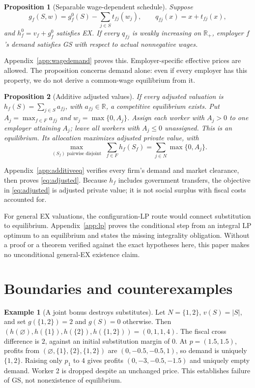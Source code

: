 \documentclass[11pt]{article}
\newtheorem{proposition}{Proposition}
\theoremstyle{definition}
\newtheorem{example}{Example}
\theoremstyle{remark}
\numberwithin{equation}{section}
\begin{document}
\begin{proposition}[Separable wage-dependent schedule]\label{prop:wagedemand}
Suppose
\begin{equation}
g_f(S,w)=g_f^0(S)-\sum_{j\in S}t_{fj}(w_j),\qquad
q_{fj}(x)=x+t_{fj}(x),                          \label{eq:effective}
\end{equation}
and $h_f^0=v_f+g_f^0$ satisfies EX. If every $q_{fj}$ is weakly increasing on $\mathbb R_+$, employer $f$'s demand satisfies GS with respect to actual nonnegative wages.
\end{proposition}
\noindent Appendix~\ref{app:wagedemand} proves this. Employer-specific effective prices are allowed. The proposition concerns demand alone: even if every employer has this property, we do not derive a common-wage equilibrium from it.

\begin{proposition}[Additive adjusted values]\label{prop:additiveeq}
If every adjusted valuation is $h_f(S)=\sum_{j\in S}a_{fj}$, with $a_{fj}\in\mathbb R$, a competitive equilibrium exists. Put $A_j=\max_{f\in F}a_{fj}$ and $w_j=\max\{0,A_j\}$. Assign each worker with $A_j>0$ to one employer attaining $A_j$; leave all workers with $A_j\le0$ unassigned. This is an equilibrium. Its allocation maximizes adjusted private value, with
\begin{equation}
\max_{\substack{(S_f)\text{ pairwise disjoint}}}
\sum_{f\in F}h_f(S_f)
=\sum_{j\in N}\max\{0,A_j\}.                  \label{eq:adjusted}
\end{equation}
\end{proposition}
\noindent Appendix~\ref{app:additiveeq} verifies every firm's demand and market clearance, then proves \eqref{eq:adjusted}. Because $h_f$ includes government transfers, the objective in \eqref{eq:adjusted} is adjusted private value; it is not social surplus with fiscal costs accounted for.

For general EX valuations, the configuration-LP route would connect substitution to equilibrium. Appendix~\ref{app:lp} proves the conditional step from an integral LP optimum to an equilibrium and states the missing integrality obligation. Without a proof or a theorem verified against the exact hypotheses here, this paper makes no unconditional general-EX existence claim.

\section{Boundaries and counterexamples}
\begin{example}[A joint bonus destroys substitutes]\label{ex:bonus}
Let $N=\{1,2\}$, $v(S)=|S|$, and set $g(\{1,2\})=2$ and $g(S)=0$ otherwise. Then $(h(\varnothing),h(\{1\}),h(\{2\}),h(\{1,2\}))=(0,1,1,4)$. The fiscal cross difference is $2$, against an initial substitution margin of $0$. At $p=(1.5,1.5)$, profits from $(\varnothing,\{1\},\{2\},\{1,2\})$ are $(0,-0.5,-0.5,1)$, so demand is uniquely $\{1,2\}$. Raising only $p_1$ to $4$ gives profits $(0,-3,-0.5,-1.5)$ and uniquely empty demand. Worker 2 is dropped despite an unchanged price. This establishes failure of GS, not nonexistence of equilibrium.
\end{example}
\end{document}
